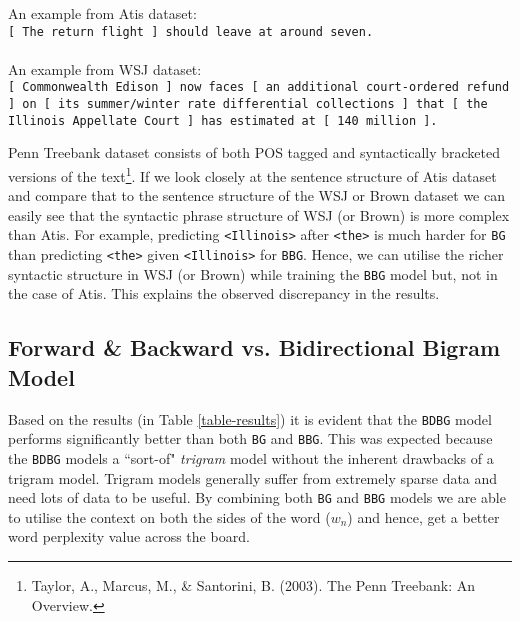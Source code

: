 \documentclass[a4paper]{article}
\newcommand{\code}[1]{\texttt{#1}}
\begin{document}
\vspace{\baselineskip}
\begin{minipage}{39em}
An example from Atis dataset:\\
\code{[ The return flight ] should leave at around seven.}\\\\
An example from WSJ dataset:\\
\code{[ Commonwealth Edison ] now faces [ an additional court-ordered refund ] on [ its summer/winter rate differential collections ] that [ the Illinois Appellate Court ] has estimated at [ 140 million ].}
\end{minipage}
\vspace{\baselineskip}

Penn Treebank dataset consists of both POS tagged and syntactically bracketed versions of the text\footnote{Taylor, A., Marcus, M., \& Santorini, B. (2003). The Penn Treebank: An Overview.}. If we look closely at the sentence structure of Atis dataset and compare that to the sentence structure of the WSJ or Brown dataset we can easily see that the syntactic phrase structure of WSJ (or Brown) is more complex than Atis. For example, predicting \code{<Illinois>} after \code{<the>} is much harder for \code{BG} than predicting \code{<the>} given \code{<Illinois>} for \code{BBG}. Hence, we can utilise the richer syntactic structure in WSJ (or Brown) while training the \code{BBG} model but, not in the case of Atis. This explains the observed discrepancy in the results.

\subsection{Forward \& Backward vs. Bidirectional Bigram Model}

Based on the results (in Table \ref{table-results}) it is evident that the \code{BDBG} model performs significantly better than both \code{BG} and \code{BBG}. This was expected because the \code{BDBG} models a ``sort-of" \emph{trigram} model without the inherent drawbacks of a trigram model. Trigram models generally suffer from extremely sparse data and need lots of data to be useful. By combining both \code{BG} and \code{BBG} models we are able to utilise the context on both the sides of the word ($w_n$) and hence, get a better word perplexity value across the board.
\end{document}
